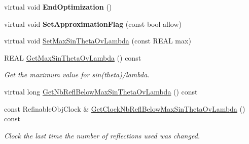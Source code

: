 \begin{DoxyCompactItemize}
virtual void {\bfseries End\+Optimization} ()
\item 
\mbox{\label{class_obj_cryst_1_1_scattering_data_a59c45099a1d3a191e072e3bcf38b8660}} 
virtual void {\bfseries Set\+Approximation\+Flag} (const bool allow)
\item 
virtual void \mbox{\hyperlink{class_obj_cryst_1_1_scattering_data_a58e988862eb0e7b128a563e38f07eb22}{Set\+Max\+Sin\+Theta\+Ov\+Lambda}} (const R\+E\+AL max)
\item 
\mbox{\label{class_obj_cryst_1_1_scattering_data_a395dc507584a607250616000aec3c76f}} 
R\+E\+AL \mbox{\hyperlink{class_obj_cryst_1_1_scattering_data_a395dc507584a607250616000aec3c76f}{Get\+Max\+Sin\+Theta\+Ov\+Lambda}} () const
\begin{DoxyCompactList}\small\item\em Get the maximum value for sin(theta)/lambda. \end{DoxyCompactList}\item 
virtual long \mbox{\hyperlink{class_obj_cryst_1_1_scattering_data_aeceded13328adf88e001b08ce1abed7f}{Get\+Nb\+Refl\+Below\+Max\+Sin\+Theta\+Ov\+Lambda}} () const
\item 
\mbox{\label{class_obj_cryst_1_1_scattering_data_a0f6f14009b6d935d9704f2a779d00fbd}} 
const Refinable\+Obj\+Clock \& \mbox{\hyperlink{class_obj_cryst_1_1_scattering_data_a0f6f14009b6d935d9704f2a779d00fbd}{Get\+Clock\+Nb\+Refl\+Below\+Max\+Sin\+Theta\+Ov\+Lambda}} () const
\begin{DoxyCompactList}\small\item\em Clock the last time the number of reflections used was changed. \end{DoxyCompactList}\end{DoxyCompactItemize}
